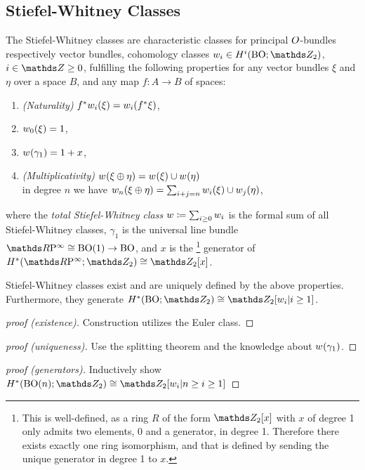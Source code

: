\subsection{Stiefel-Whitney Classes}
\begin{Def}\label{def:swclasses}
  The Stiefel-Whitney classes are
  characteristic classes for principal $O$-bundles
  respectively vector bundles,
  \idest cohomology classes
  $\ws{i}\in \H^i(\BO;\Zmod2)$, $i\in\Z\geq0$,
  fulfilling the following properties for any vector bundles $\xi$ and
  $\eta$ over a space $B$, and any map $f\colon A\to B$ of spaces:
  \begin{enumerate}
  \item \emph{(Naturality)} ${f}^*{w_{i}}(\xi) = {w_{i}}({f}^* \xi)$,
  \item ${w_{0}}(\xi)=1$,
  \item ${w_{}}(\gamma_1) = 1 + x$,
  \item \emph{(Multiplicativity)} ${w_{}}(\xi \oplus \eta) = {w_{}}(\xi)\cup {w_{}}(\eta)$
    \\\idest in degree $n$ we have
    ${w_{n}}(\xi\oplus\eta) = \sum_{i+j=n}{w_{i}}(\xi) \cup {w_{j}}(\eta)$,
  \end{enumerate}
  where the \emph{total Stiefel-Whitney class}
  $w\coloneqq\sum_{i\geq 0}w_{i}$ is the formal sum of all
  Stiefel-Whitney classes,
  $\gamma_1$ is the universal line bundle $\RP\cong\BO(1)\to\BO$,
  and $x$ is the%
  \footnote{
    This is well-defined, as a ring $R$ of the form $\Zmod2[x]$
    with $x$ of degree 1 only admits two elements, $0$ and a
    generator, in degree 1. Therefore there exists exactly one ring
    isomorphism, and that is defined by sending the unique generator in
    degree 1 to $x$.
  }
  generator of $\H^*(\RP;\Zmod2)\cong\Zmod2[x]$.
\end{Def}

\begin{Thm} %
  Stiefel-Whitney classes exist and are uniquely defined by the above
  properties. Furthermore, they generate $\H^*(\BO;\Zmod2)\cong \Zmod2[\ws{i}|i\geq1]$.
  \begin{proof}[proof (existence)]
    Construction utilizes the Euler class.
  \end{proof}
  \begin{proof}[proof (uniqueness)]
    Use the splitting theorem and the knowledge about ${w_{}}(\gamma_1)$.
  \end{proof}
  \begin{proof}[proof (generators)]
    Inductively show $\H^*(\BO(n);\Zmod2)\cong \Zmod2[\ws{i}|n\geq i\geq1]$
  \end{proof}
\end{Thm}

